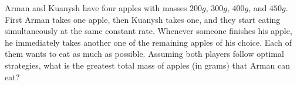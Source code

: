 Arman and Kuanysh have four apples with masses $200g$, $300g$, $400g$, and $450g$. First Arman takes one apple, then Kuanysh takes one, and they start eating simultaneously at the same constant rate. Whenever someone finishes his apple, he immediately takes another one of the remaining apples of his choice. Each of them wants to eat as much as possible. Assuming both players follow optimal strategies, what is the greatest total mass of apples (in grams) that Arman can eat?
